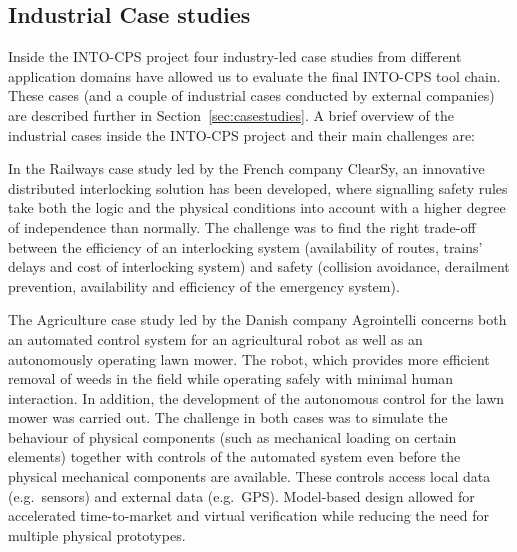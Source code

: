 \subsection{Industrial Case studies}
Inside the INTO-CPS project four industry-led case studies from different application domains have allowed us to evaluate the final INTO-CPS tool chain. These cases (and a couple of industrial cases conducted by external companies) are described further in Section~\ref{sec:casestudies}. A brief overview of the industrial cases inside the INTO-CPS project and their main challenges are:

In the Railways case study led by the French company ClearSy, an innovative distributed interlocking solution has been developed, where signalling safety rules take both the logic and the physical conditions into account with a higher degree of independence than normally. The challenge was to find the right trade-off between the efficiency of an interlocking system (availability of routes, trains' delays and cost of interlocking system) and safety (collision avoidance, derailment prevention, availability and efficiency of the emergency system).

The Agriculture case study led by the Danish company Agrointelli concerns both an automated control system for an agricultural robot as well as an autonomously operating lawn mower. The robot, which provides more efficient removal of weeds in the field while operating safely with minimal human interaction. In addition, the development of the autonomous control for the lawn mower was carried out. The challenge in both cases was to simulate the behaviour of physical components (such as mechanical loading on certain elements) together with controls of the automated system even before the physical mechanical components are available. These controls access local data (e.g.\ sensors) and external data (e.g.\ GPS). Model-based design allowed for accelerated time-to-market and virtual verification while reducing the need for multiple physical prototypes.

